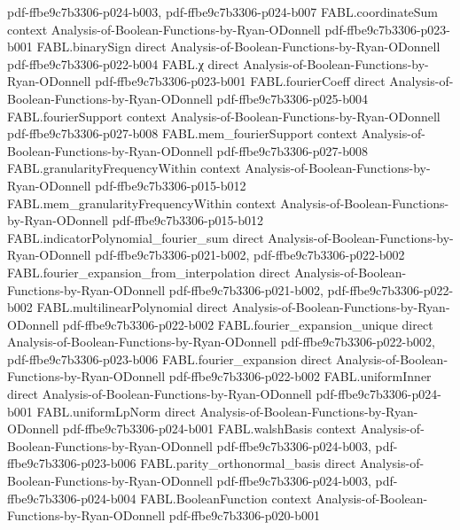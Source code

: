 \begin{theorem}
  {pdf-ffbe9c7b3306-p024-b003,
    pdf-ffbe9c7b3306-p024-b007}
\proofstep
  {FABL.coordinateSum}
  {context}
  {Analysis-of-Boolean-Functions-by-Ryan-ODonnell}
  {pdf-ffbe9c7b3306-p023-b001}
\proofstep
  {FABL.binarySign}
  {direct}
  {Analysis-of-Boolean-Functions-by-Ryan-ODonnell}
  {pdf-ffbe9c7b3306-p022-b004}
\proofstep
  {FABL.χ}
  {direct}
  {Analysis-of-Boolean-Functions-by-Ryan-ODonnell}
  {pdf-ffbe9c7b3306-p023-b001}
\proofstep
  {FABL.fourierCoeff}
  {direct}
  {Analysis-of-Boolean-Functions-by-Ryan-ODonnell}
  {pdf-ffbe9c7b3306-p025-b004}
\proofstep
  {FABL.fourierSupport}
  {context}
  {Analysis-of-Boolean-Functions-by-Ryan-ODonnell}
  {pdf-ffbe9c7b3306-p027-b008}
\proofstep
  {FABL.mem_fourierSupport}
  {context}
  {Analysis-of-Boolean-Functions-by-Ryan-ODonnell}
  {pdf-ffbe9c7b3306-p027-b008}
\proofstep
  {FABL.granularityFrequencyWithin}
  {context}
  {Analysis-of-Boolean-Functions-by-Ryan-ODonnell}
  {pdf-ffbe9c7b3306-p015-b012}
\proofstep
  {FABL.mem_granularityFrequencyWithin}
  {context}
  {Analysis-of-Boolean-Functions-by-Ryan-ODonnell}
  {pdf-ffbe9c7b3306-p015-b012}
\proofstep
  {FABL.indicatorPolynomial_fourier_sum}
  {direct}
  {Analysis-of-Boolean-Functions-by-Ryan-ODonnell}
  {pdf-ffbe9c7b3306-p021-b002,
    pdf-ffbe9c7b3306-p022-b002}
\proofstep
  {FABL.fourier_expansion_from_interpolation}
  {direct}
  {Analysis-of-Boolean-Functions-by-Ryan-ODonnell}
  {pdf-ffbe9c7b3306-p021-b002,
    pdf-ffbe9c7b3306-p022-b002}
\proofstep
  {FABL.multilinearPolynomial}
  {direct}
  {Analysis-of-Boolean-Functions-by-Ryan-ODonnell}
  {pdf-ffbe9c7b3306-p022-b002}
\proofstep
  {FABL.fourier_expansion_unique}
  {direct}
  {Analysis-of-Boolean-Functions-by-Ryan-ODonnell}
  {pdf-ffbe9c7b3306-p022-b002,
    pdf-ffbe9c7b3306-p023-b006}
\proofstep
  {FABL.fourier_expansion}
  {direct}
  {Analysis-of-Boolean-Functions-by-Ryan-ODonnell}
  {pdf-ffbe9c7b3306-p022-b002}
\proofstep
  {FABL.uniformInner}
  {direct}
  {Analysis-of-Boolean-Functions-by-Ryan-ODonnell}
  {pdf-ffbe9c7b3306-p024-b001}
\proofstep
  {FABL.uniformLpNorm}
  {direct}
  {Analysis-of-Boolean-Functions-by-Ryan-ODonnell}
  {pdf-ffbe9c7b3306-p024-b001}
\proofstep
  {FABL.walshBasis}
  {context}
  {Analysis-of-Boolean-Functions-by-Ryan-ODonnell}
  {pdf-ffbe9c7b3306-p024-b003,
    pdf-ffbe9c7b3306-p023-b006}
\proofstep
  {FABL.parity_orthonormal_basis}
  {direct}
  {Analysis-of-Boolean-Functions-by-Ryan-ODonnell}
  {pdf-ffbe9c7b3306-p024-b003,
    pdf-ffbe9c7b3306-p024-b004}
\proofstep
  {FABL.BooleanFunction}
  {context}
  {Analysis-of-Boolean-Functions-by-Ryan-ODonnell}
  {pdf-ffbe9c7b3306-p020-b001}

\end{theorem}
